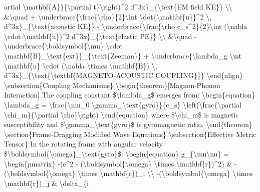 artial \textbackslash{}mathbf\{A\}\}\{\textbackslash{}partial t\}\textbackslash{}right)\textasciicircum{}2 d\textasciicircum{}3x\}\_\{\textbackslash{}text\{EM field KE\}\} \textbackslash{}\textbackslash{} \&\textbackslash{}quad + \textbackslash{}underbrace\{\textbackslash{}frac\{\textbackslash{}rho\}\{2\}\textbackslash{}int \textbackslash{}dot\{\textbackslash{}mathbf\{u\}\}\textasciicircum{}2 \textbackslash{}, d\textasciicircum{}3x\}\_\{\textbackslash{}text\{acoustic KE\}\} - \textbackslash{}underbrace\{\textbackslash{}frac\{\textbackslash{}rho c\_s\textasciicircum{}2\}\{2\}\textbackslash{}int (\textbackslash{}nabla \textbackslash{}cdot \textbackslash{}mathbf\{u\})\textasciicircum{}2 d\textasciicircum{}3x\}\_\{\textbackslash{}text\{elastic PE\}\} \textbackslash{}\textbackslash{} \&\textbackslash{}quad - \textbackslash{}underbrace\{\textbackslash{}boldsymbol\{\textbackslash{}mu\} \textbackslash{}cdot \textbackslash{}mathbf\{B\}\_\textbackslash{}text\{ext\}\}\_\{\textbackslash{}text\{Zeeman\}\} + \textbackslash{}underbrace\{\textbackslash{}lambda\_g \textbackslash{}int \textbackslash{}mathbf\{u\} \textbackslash{}cdot (\textbackslash{}nabla \textbackslash{}times \textbackslash{}mathbf\{B\}) \textbackslash{}, d\textasciicircum{}3x\}\_\{\textbackslash{}text\{\textbackslash{}textbf\{MAGNETO-ACOUSTIC COUPLING\}\}\} \textbackslash{}end\{align\} \textbackslash{}subsection\{Coupling Mechanisms\} \textbackslash{}begin\{theorem\}[Magnon-Phonon Interaction] The coupling constant \$\textbackslash{}lambda\_g\$ emerges from: \textbackslash{}begin\{equation\} \textbackslash{}lambda\_g = \textbackslash{}frac\{\textbackslash{}mu\_0 \textbackslash{}gamma\_\textbackslash{}text\{gyro\}\}\{c\_s\} \textbackslash{}left(\textbackslash{}frac\{\textbackslash{}partial \textbackslash{}chi\_m\}\{\textbackslash{}partial \textbackslash{}rho\}\textbackslash{}right) \textbackslash{}end\{equation\} where \$\textbackslash{}chi\_m\$ is magnetic susceptibility and \$\textbackslash{}gamma\_\textbackslash{}text\{gyro\}\$ is gyromagnetic ratio. \textbackslash{}end\{theorem\} \textbackslash{}section\{Frame-Dragging Modified Wave Equations\} \textbackslash{}subsection\{Effective Metric Tensor\} In the rotating frame with angular velocity \$\textbackslash{}boldsymbol\{\textbackslash{}omega\}\_\textbackslash{}text\{gyro\}\$: \textbackslash{}begin\{equation\} g\_\{\textbackslash{}mu\textbackslash{}nu\} = \textbackslash{}begin\{pmatrix\} -(c\textasciicircum{}2 - (\textbackslash{}boldsymbol\{\textbackslash{}omega\} \textbackslash{}times \textbackslash{}mathbf\{r\})\textasciicircum{}2) \& -(\textbackslash{}boldsymbol\{\textbackslash{}omega\} \textbackslash{}times \textbackslash{}mathbf\{r\})\_i \textbackslash{}\textbackslash{} -(\textbackslash{}boldsymbol\{\textbackslash{}omega\} \textbackslash{}times \textbackslash{}mathbf\{r\})\_j \& \textbackslash{}delta\_\{i

